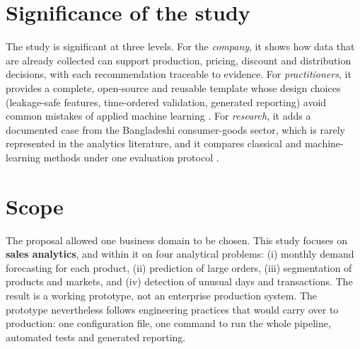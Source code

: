 \section{Significance of the study}
The study is significant at three levels. For the \emph{company}, it shows how data that are already collected
can support production, pricing, discount and distribution decisions, with each recommendation traceable to
evidence. For \emph{practitioners}, it provides a complete, open-source and reusable template whose design
choices (leakage-safe features, time-ordered validation, generated reporting) avoid common mistakes of applied
machine learning \citep{kaufman2012, sculley2015}. For \emph{research}, it adds a documented case from the
Bangladeshi consumer-goods sector, which is rarely represented in the analytics literature, and it compares
classical and machine-learning methods under one evaluation protocol \citep{hyndman2021}.

\section{Scope}
The proposal allowed one business domain to be chosen. This study focuses on \textbf{sales analytics}, and
within it on four analytical problems: (i) monthly demand forecasting for each product, (ii) prediction of
large orders, (iii) segmentation of products and markets, and (iv) detection of unusual days and transactions.
The result is a working prototype, not an enterprise production system. The prototype nevertheless follows
engineering practices that would carry over to production: one configuration file, one command to run the
whole pipeline, automated tests and generated reporting.

